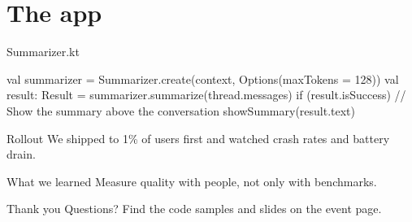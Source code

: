 \documentclass[aspectratio=169]{beamer}
\begin{document}
\section{The app}

\begin{frame}
\begin{code}[language=Java, emph={Summarizer,Options,Result}]
Summarizer.kt

val summarizer = Summarizer.create(context, Options(maxTokens = 128))
val result: Result = summarizer.summarize(thread.messages)
if (result.isSuccess) {
    // Show the summary above the conversation
    showSummary(result.text)
}
\end{code}
\end{frame}

\begin{frame}[split]{Rollout}
  We shipped to 1\% of users first and watched crash rates and battery drain.
\end{frame}

\begin{frame}
\end{frame}

\begin{frame}[split]{What we learned}
  Measure quality with people, not only with benchmarks.
\end{frame}

\begin{frame}[dark]{Thank you}
  Questions? Find the code samples and slides on the event page.
\end{frame}

\begin{frame}
\end{frame}
\end{document}
